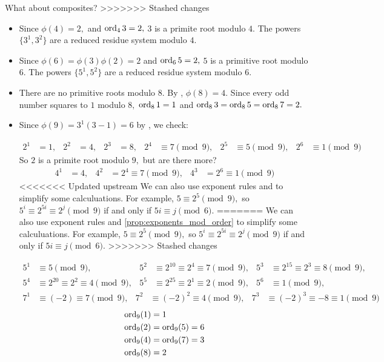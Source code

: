 \documentclass{ximera}
\begin{document}
What about composites?
>>>>>>> Stashed changes
\begin{example}
    
    \begin{itemize}
        \item Since $\phi(4)=2,$ and $\operatorname{ord}_4 3=2,$ $3$ is a primite root modulo $4.$ The powers $\{3^1, 3^2\}$ are a reduced residue system modulo $4.$
        \item Since $\phi(6)=\phi(3)\phi(2)=2$ and $\operatorname{ord}_6 5=2,$ $5$ is a primitive root modulo $6.$ The powers $\{5^1, 5^2\}$ are a reduced residue system modulo $6.$
        \item There are no primitive roots modulo $8.$ By , $\phi(8)=4.$ Since every odd number squares to $1$ modulo $8,$ $\operatorname{ord}_8 1=1$ and $\operatorname{ord}_8 3=\operatorname{ord}_8 5=\operatorname{ord}_8 7=2.$ 
        \item Since $\phi(9)=3^1(3-1)=6$ by , we check:

        \begin{align*}
            2^1&=1, &2^2&=4, &2^3&=8, &2^4&\equiv7\pmod{9}, &2^5&\equiv 5\pmod{9},&2^6&\equiv 1\pmod{9}
        \end{align*}
        So $2$ is a primite root modulo $9,$ but are there more?
        \begin{align*}
            4^1&=4, &4^2&=2^4\equiv 7\pmod{9}, &4^3&=2^6\equiv1\pmod{9}
        \end{align*}
<<<<<<< Updated upstream
        We can also use exponent rules and  to simplify some calculuations. For example, $5\equiv 2^5\pmod{9},$ so $5^i\equiv 2^{5i}\equiv 2^j\pmod{9}$ if and only if $5i\equiv j\pmod{6}.$
=======
        We can also use exponent rules and \cref{prop:exponents_mod_order} to simplify some calculuations. For example, $5\equiv 2^5\pmod{9},$ so $5^i\equiv 2^{5i}\equiv 2^j\pmod{9}$ if and only if $5i\equiv j\pmod{6}.$
>>>>>>> Stashed changes

        \begin{align*}
            5^1&\equiv 5\pmod{9}, 
            &5^2&\equiv 2^{10}\equiv 2^4\equiv 7\pmod{9},
            &5^3&\equiv 2^{15}\equiv 2^3\equiv 8\pmod{9}, \\
            5^4&\equiv 2^{20}\equiv 2^2\equiv 4\pmod{9}, 
            &5^5&\equiv 2^{25}\equiv 2^1\equiv 2\pmod{9},
            &5^6&\equiv 1\pmod{9},
        \end{align*}
        \begin{align*}
            7^1&\equiv (-2)\equiv 7\pmod{9}, 
            &7^2&\equiv (-2)^2\equiv 4\pmod{9},
            &7^3&\equiv (-2)^{3}\equiv -8 \equiv 1\pmod{9}
        \end{align*}
        \begin{align*}
            \operatorname{ord}_9(1)&=1\\
            \operatorname{ord}_9(2)&=\operatorname{ord}_9(5)=6\\
            \operatorname{ord}_9(4)&=\operatorname{ord}_9(7)=3\\
            \operatorname{ord}_9 (8)&=2
        \end{align*}
    \end{itemize}
\end{example}
\end{document}

